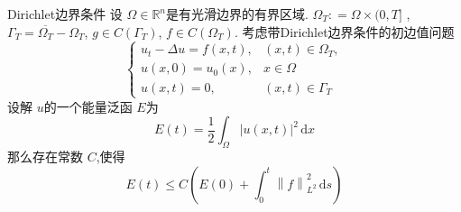 \documentclass[../../main.tex]{subfiles}
\begin{document}
\begin{theorem}{Dirichlet边界条件}
设 \(   \Omega \in \mathbb{R} ^{n}  \)是有光滑边界的有界区域. \(   \Omega _{T}: =   \Omega \times (0,T]  \)    , \(   \Gamma _{T}=  \overline{ \Omega _{T}}- \Omega _{T}  \), \(  g \in C\left(  \Gamma _{T} \right)   \), \(  f \in C\left(  \Omega _{T} \right)   \). 考虑带Dirichlet边界条件的初边值问题 \[
\begin{cases} u_{t}- \Delta u= f\left( x,t \right) ,&\left( x,t \right)\in  \Omega _{T},\\ 
 u \left( x,0 \right)= u_0\left( x \right),& x\in  \Omega \\ 
  u\left( x,t \right)= 0,&\left( x,t \right) \in  \Gamma _{T}    \end{cases} 
\]设解 \(  u  \)的一个能量泛函 \(  E  \)为 \[
E\left( t \right)= \frac{1 }{2 } \int_{ \Omega } \left| u\left( x,t \right)  \right|^{2} \,\mathrm{d} x   
\]  那么存在常数 \(  C  \),使得   \[
   E\left( t \right)\le C\left( E\left( 0 \right)+ \int_{0}^{t}\left\| f \right\|^{2}_{L^{2}}  \,\mathrm{d} s\right)  
    \]
\end{theorem}
\end{document}
